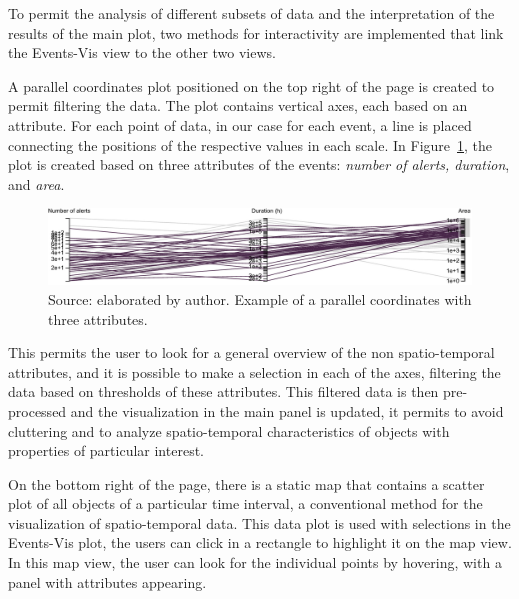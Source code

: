To permit the analysis of different subsets of data and the interpretation of the results of the main plot, two methods for interactivity are implemented that link the Events-Vis view to the other two views.
%

A parallel coordinates plot positioned on the top right of the page is created to permit filtering the data. 
%
The plot contains vertical axes, each based on an attribute. 
%
For each point of data, in our case for each event, a line is placed connecting the positions of the respective values in each scale.
%
In Figure~\ref{fig:parallel-example}, the plot is created based on three attributes of the events: \textit{number of alerts, duration}, and \textit{area}.

\begin{figure}[hb]
    \centering
    \includegraphics[width = 0.7\linewidth]{src/imgs/parallel-coordinates.pdf}
    \caption{Source: elaborated by author. Example of a parallel coordinates with three attributes.}
    \label{fig:parallel-example}
\end{figure}

This permits the user to look for a general overview of the non spatio-temporal attributes,
%
and it is possible to make a selection in each of the axes, filtering the data based on thresholds of these attributes.
%
This filtered data is then pre-processed and the visualization in the main panel is updated, 
%
it permits to avoid cluttering
%
and to analyze spatio-temporal characteristics of objects with properties of particular interest.

On the bottom right of the page, there is a static map that contains a scatter plot of all objects of a particular time interval, a conventional method for the visualization of spatio-temporal data.
%
This data plot is used with selections in the Events-Vis plot, 
%
the users can click in a rectangle to highlight it on the map view.
%
In this map view, the user can look for the individual points by hovering, with a panel with attributes appearing.
